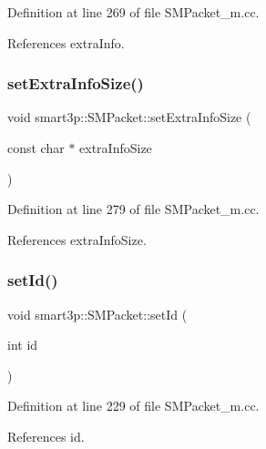 Definition at line 269 of file S\+M\+Packet\+\_\+m.\+cc.



References extra\+Info.

\mbox{\label{classsmart3p_1_1SMPacket_a4012df901869826bdd19394312489ce8}} 
\subsubsection{\texorpdfstring{set\+Extra\+Info\+Size()}{setExtraInfoSize()}}
{\footnotesize\ttfamily void smart3p\+::\+S\+M\+Packet\+::set\+Extra\+Info\+Size (\begin{DoxyParamCaption}\item[{const char $\ast$}]{extra\+Info\+Size }\end{DoxyParamCaption})\hspace{0.3cm}{\ttfamily [virtual]}}



Definition at line 279 of file S\+M\+Packet\+\_\+m.\+cc.



References extra\+Info\+Size.

\mbox{\label{classsmart3p_1_1SMPacket_a9ba1e3a6882f264a5c26598db65f2c16}} 
\subsubsection{\texorpdfstring{set\+Id()}{setId()}}
{\footnotesize\ttfamily void smart3p\+::\+S\+M\+Packet\+::set\+Id (\begin{DoxyParamCaption}\item[{int}]{id }\end{DoxyParamCaption})\hspace{0.3cm}{\ttfamily [virtual]}}



Definition at line 229 of file S\+M\+Packet\+\_\+m.\+cc.



References id.

